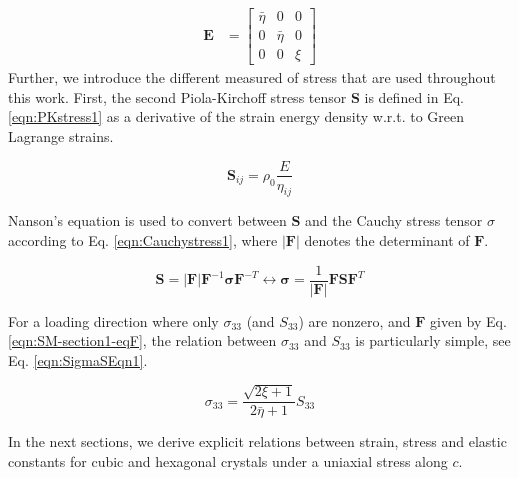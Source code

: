 \documentclass[showpacs,aps,floatfix,prb,reprint,superscriptaddress,onecolumn]{revtex4-1}
\begin{document}
\begin{equation}
\label{eqn:SM-section1-eqE}
  \begin{aligned}
        \bm{E}&=\begin{bmatrix} \bar{\eta} & 0 & 0 \\ 0 & \bar{\eta} & 0 \\ 0 & 0 & \xi \end{bmatrix}
       \end{aligned}
\end{equation} 
Further, we introduce the different measured of stress that are used throughout this work. First, the second Piola-Kirchoff stress tensor $\mathbf{S}$ is defined in Eq. \ref{eqn:PKstress1} as a derivative of the strain energy density w.r.t. to Green Lagrange strains.

\begin{equation}
\label{eqn:PKstress1} 
\mathbf{S}_{ij} = \rho_{0} \frac{E}{\eta_{ij}}  
\end{equation}

Nanson's equation is used to convert between $\mathbf{S}$ and the Cauchy stress tensor $\sigma$ according to Eq. \ref{eqn:Cauchystress1}, where $\left| \mathbf{F} \right|$ denotes the determinant of $\mathbf{F}$. 

\begin{equation}
\label{eqn:Cauchystress1} 
\mathbf{S} = \left| \mathbf{F} \right| \mathbf{F}^{-1} \mathbf{\sigma} \mathbf{F}^{-T} \leftrightarrow \mathbf{\sigma} = \frac{1}{\left| \mathbf{F} \right| } \mathbf{F} \mathbf{S} \mathbf{F}^{T}
\end{equation}

For a loading direction where only $\sigma_{33}$ (and $S_{33}$) are nonzero, and $\mathbf{F}$ given by Eq. \ref{eqn:SM-section1-eqF}, the relation between $\sigma_{33}$ and $S_{33}$ is particularly simple, see Eq. \ref{eqn:SigmaSEqn1}.

\begin{equation}
\label{eqn:SigmaSEqn1} 
\sigma_{33} = \frac{\sqrt{2\xi + 1}}{2\bar{\eta} + 1} S_{33}
\end{equation}

In the next sections, we derive explicit relations between strain, stress and elastic constants for cubic and hexagonal crystals under a uniaxial stress along $c$.
\end{document}
